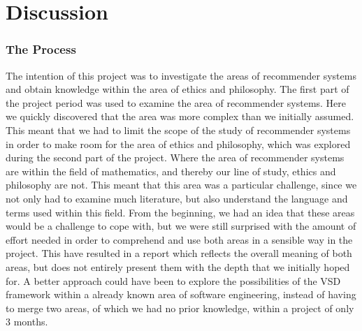 \section{Discussion}

\subsubsection*{The Process}
\label{subsubsec:process}
The intention of this project was to investigate the areas of recommender systems and obtain knowledge within the area of ethics and philosophy.\newline
The first part of the project period was used to examine the area of recommender systems. Here we quickly discovered that the area was more complex than we initially assumed. This meant that we had to limit the scope of the study of recommender systems in order to make room for the area of ethics and philosophy, which was explored during the second part of the project.\newline
Where the area of recommender systems are within the field of mathematics, and thereby our line of study, ethics and philosophy are not. This meant that this area was a particular challenge, since we not only had to examine much literature, but also understand the language and terms used within this field.\newline
From the beginning, we had an idea that these areas would be a challenge to cope with, but we were still surprised with the amount of effort needed in order to comprehend and use both areas in a sensible way in the project. This have resulted in a report which reflects the overall meaning of both areas, but does not entirely present them with the depth that we initially hoped for.\newline
A better approach could have been to explore the possibilities of the VSD framework within a already known area of software engineering, instead of having to merge two areas, of which we had no prior knowledge, within a project of only 3 months. 
 


